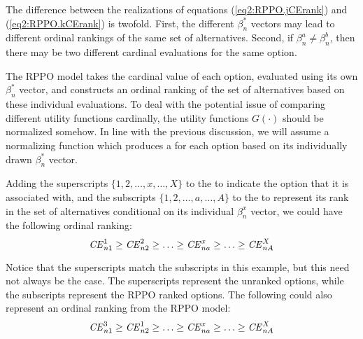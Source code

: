 \documentclass[../main.tex]{subfiles}
\begin{document}
The difference between the realizations of equations (\ref{eq2:RPPO.jCErank}) and (\ref{eq2:RPPO.kCErank}) is twofold.
First, the different $\beta_n^*$ vectors may lead to different ordinal rankings of the same set of alternatives.
Second, if $\beta_n^a \neq \beta_n^b$, then there may be two different cardinal evaluations for the same option.

The RPPO model takes the cardinal value of each option, evaluated using its own $\beta_n^*$  vector, and constructs an ordinal ranking of the set of alternatives based on these individual evaluations.
To deal with the potential issue of comparing different utility functions cardinally, the utility functions $G(\cdot)$ should be normalized somehow.{\footnotemark}
In line with the previous discussion, we will assume a normalizing function which produces a {\CE} for each option based on its individually drawn $\beta_n^*$ vector.

\addtocounter{footnote}{-1}

Adding the superscripts $\{1,2,\ldots,x,\ldots,X\}$  to the {\CE} to indicate the option that it is associated with, and the subscripts $\{1,2,\ldots,a,\ldots,A\}$ to the {\CE} to represent its rank in the set of alternatives conditional on its individual $\beta_n^x$ vector, we could have the following ordinal ranking:
\begin{equation}
	\label{eq2:RPPO.CErank.f}
	{\ensuremath{\mathit{CE}}}^1_{n1} \geq {\ensuremath{\mathit{CE}}}^2_{n2} \geq \ldots \geq {\ensuremath{\mathit{CE}}}^x_{na} \geq \ldots \geq {\ensuremath{\mathit{CE}}}^X_{nA}
\end{equation}

Notice that the superscripts match the subscripts in this example, but this need not always be the case.
The superscripts represent the unranked options, while the subscripts represent the RPPO ranked options.
The following could also represent an ordinal ranking from the RPPO model:
\begin{equation}
	\label{eq2:RPPO.CErank.a}
	{\ensuremath{\mathit{CE}}}^3_{n1} \geq {\ensuremath{\mathit{CE}}}^1_{n2} \geq \ldots \geq {\ensuremath{\mathit{CE}}}^x_{na} \geq \ldots \geq {\ensuremath{\mathit{CE}}}^X_{nA}
\end{equation}
\end{document}
